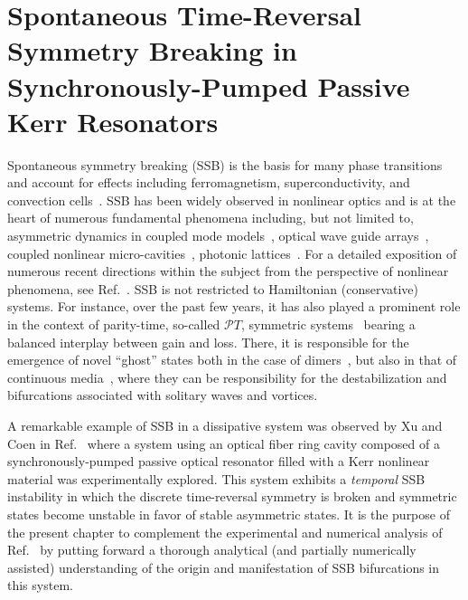 \section[Spontaneous Time-Reversal Symmetry Breaking in Passive Kerr Resonator]{Spontaneous Time-Reversal Symmetry Breaking in \\
Synchronously-Pumped Passive Kerr Resonators} \label{section:SSB}
%
Spontaneous symmetry breaking (SSB) is the basis for many phase transitions and account for effects including ferromagnetism, superconductivity, and convection cells~\cite{zurek,stanley}.
%
SSB has been widely observed in nonlinear optics and is at the heart of numerous
fundamental phenomena including, but not limited to, asymmetric
dynamics in coupled 
mode models~\cite{kenkre}, optical wave guide arrays~\cite{Boris_Gisin_Kaplan_PRE_2000},
coupled nonlinear micro-cavities~\cite{Haelterman_OE_2006}, 
photonic lattices~\cite{Panos_PLA_2005}. For a detailed exposition
of numerous recent directions within the subject from the perspective
of nonlinear phenomena, see Ref.~\cite{Boris_SSB_book}.
%
SSB is not restricted to Hamiltonian (conservative) systems. For instance, 
over the past few years, it has also played a prominent role in the context of parity-time, 
so-called ${\mathcal PT}$, symmetric
systems~\cite{kivshar,yang} bearing a balanced interplay between 
gain and loss. 
%
There, it is responsible for the emergence 
of novel ``ghost'' states both in the case of dimers~\cite{cartarius}, but also in that
of continuous media~\cite{rcg:88}, where they can be responsibility
for the destabilization and bifurcations associated with solitary
waves and vortices.

A remarkable example of SSB in a dissipative system was observed by 
Xu and Coen in Ref.~\cite{XuCoen} where a system using an optical fiber ring cavity composed of 
a synchronously-pumped 
passive optical resonator filled with a Kerr nonlinear material was experimentally 
explored. This system exhibits a {\em temporal} SSB instability in which the 
discrete time-reversal symmetry is broken and symmetric states become unstable
in favor of stable asymmetric states.  
%
It is the purpose of the present chapter to complement
the experimental and numerical analysis of Ref.~\cite{XuCoen} by
putting forward a thorough analytical
(and partially numerically assisted) 
understanding of the origin and manifestation of SSB bifurcations in this 
system.

